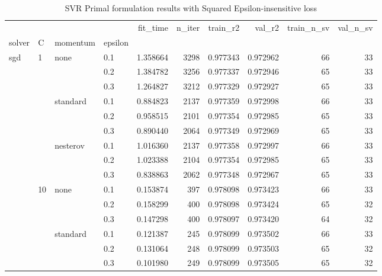 \begin{table}[H]
\centering
\caption{SVR Primal formulation results with Squared Epsilon-insensitive loss}
\label{primal_svr_squared_eps_cv_results}
\begin{tabular}{llllrrrrrr}
\toprule
          &     &   &     &  fit\_time &  n\_iter &  train\_r2 &    val\_r2 &  train\_n\_sv &  val\_n\_sv \\
solver & C & momentum & epsilon &           &         &           &           &             &           \\
\midrule
sgd & 1   & none & 0.1 &  1.358664 &    3298 &  0.977343 &  0.972962 &          66 &        33 \\
          &     &   & 0.2 &  1.384782 &    3256 &  0.977337 &  0.972946 &          65 &        33 \\
          &     &   & 0.3 &  1.264827 &    3212 &  0.977329 &  0.972927 &          65 &        33 \\
          &     & standard & 0.1 &  0.884823 &    2137 &  0.977359 &  0.972998 &          66 &        33 \\
          &     &   & 0.2 &  0.958515 &    2101 &  0.977354 &  0.972985 &          65 &        33 \\
          &     &   & 0.3 &  0.890440 &    2064 &  0.977349 &  0.972969 &          65 &        33 \\
          &     & nesterov & 0.1 &  1.016360 &    2137 &  0.977358 &  0.972997 &          66 &        33 \\
          &     &   & 0.2 &  1.023388 &    2104 &  0.977354 &  0.972985 &          65 &        33 \\
          &     &   & 0.3 &  0.838863 &    2062 &  0.977348 &  0.972967 &          65 &        33 \\
          & 10  & none & 0.1 &  0.153874 &     397 &  0.978098 &  0.973423 &          66 &        33 \\
          &     &   & 0.2 &  0.158299 &     400 &  0.978098 &  0.973424 &          65 &        32 \\
          &     &   & 0.3 &  0.147298 &     400 &  0.978097 &  0.973420 &          64 &        32 \\
          &     & standard & 0.1 &  0.121387 &     245 &  0.978099 &  0.973502 &          66 &        33 \\
          &     &   & 0.2 &  0.131064 &     248 &  0.978099 &  0.973503 &          65 &        32 \\
          &     &   & 0.3 &  0.101980 &     249 &  0.978099 &  0.973505 &          65 &        32 \\

\end{tabular}
\end{table}
